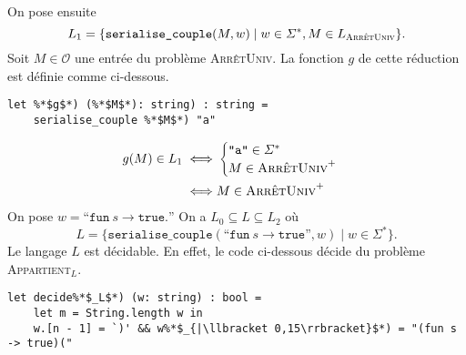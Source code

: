 \begin{enumerate}
		On pose ensuite \[
			L_1 = \{\texttt{serialise\_couple}(M, w) \mid w \in \Sigma^*, M \in L_{\textsc{ArrêtUniv}} \}
		.\]
		Soit $M \in \mathcal{O}$\/ une entrée du problème \textsc{ArrêtUniv}.
		La fonction $g$\/ de cette réduction est définie comme ci-dessous.
		\begin{lstlisting}[language=caml]
let %*$g$*) (%*$M$*): string) : string =
	serialise_couple %*$M$*) "a"
		\end{lstlisting}
		\begin{align*}
			g(M) \in L_1 \iff& \begin{cases}
				\texttt{"a"} \in \Sigma^*\\
				M \in \textsc{ArrêtUniv}^+
			\end{cases}\\
			\iff& M \in \textsc{ArrêtUniv}^+
		\end{align*}
		On pose $w = \text{``}\texttt{fun}\ s \to \texttt{true}.\text{''}$ On a $L_0 \subseteq L \subseteq L_2$ où \[
			L = \{\texttt{serialise\_couple}(\text{``}\texttt{fun}\ s \to \texttt{true}\text{''}, w)  \mid w \in \Sigma^*\} 
		.\] Le langage $L$\/ est décidable. En effet, le code ci-dessous décide du problème \textsc{Appartient}$_L$.
		\begin{lstlisting}[language=caml]
let decide%*$_L$*) (w: string) : bool =
	let m = String.length w in
	w.[n - 1] = `)' && w%*$_{|\llbracket 0,15\rrbracket}$*) = "(fun s -> true)("
		\end{lstlisting}
\end{enumerate}

